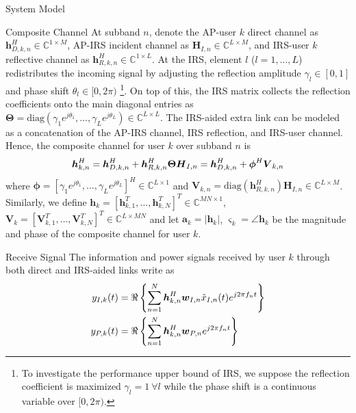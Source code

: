 \documentclass{IEEEtran}
\begin{document}
\begin{section}{System Model}
	\begin{subsection}{Composite Channel}
		At subband $n$, denote the AP-user $k$ direct channel as $\boldsymbol{h}_{D,k,n}^H \in \mathbb{C}^{1 \times M}$, AP-IRS incident channel as $\boldsymbol{H}_{I,n} \in \mathbb{C}^{L \times M}$, and IRS-user $k$ reflective channel as $\boldsymbol{h}_{R,k,n}^H \in \mathbb{C}^{1 \times L}$. At the IRS, element $l$ ($l=1,\dots,L$) redistributes the incoming signal by adjusting the reflection amplitude $\gamma_l \in [0,1]$ and phase shift $\theta_l \in [0,2\pi)$ \footnote{To investigate the performance upper bound of IRS, we suppose the reflection coefficient is maximized $\gamma_l=1 \ \forall l$ while the phase shift is a continuous variable over $[0,2\pi)$.}. On top of this, the IRS matrix collects the reflection coefficients onto the main diagonal entries as $\boldsymbol{\Theta} = \mathrm{diag}(\gamma_1 e^{j \theta_1}, \dots, \gamma_L e^{j \theta_L}) \in \mathbb{C}^{L \times L}$. The IRS-aided extra link can be modeled as a concatenation of the AP-IRS channel, IRS reflection, and IRS-user channel. Hence, the composite channel for user $k$ over subband $n$ is
		\begin{equation}\label{eq:h_{k,n}}
			\boldsymbol{h}_{k,n}^H = \boldsymbol{h}_{D,k,n}^H + \boldsymbol{h}_{R,k,n}^H \boldsymbol{\Theta} \boldsymbol{H}_{I,n} = \boldsymbol{h}_{D,k,n}^H + \boldsymbol{\phi}^H \boldsymbol{V}_{k,n}
		\end{equation}
		where $\boldsymbol{\phi}=[\gamma_1 e^{j \theta_1}, \dots, \gamma_L e^{j \theta_L}]^H \in \mathbb{C}^{L \times 1}$ and $\boldsymbol{V}_{k,n}=\mathrm{diag}(\boldsymbol{h}_{R,k,n}^H)\boldsymbol{H}_{I,n} \in \mathbb{C}^{L \times M}$. Similarly, we define $\boldsymbol{h}_k=[\boldsymbol{h}_{k,1}^T,\dots,\boldsymbol{h}_{k,N}^T]^T \in \mathbb{C}^{MN \times 1}$, $\boldsymbol{V}_k=[\boldsymbol{V}_{k,1}^T,\dots,\boldsymbol{V}_{k,N}^T]^T \in \mathbb{C}^{L \times MN}$ and let $\boldsymbol{a}_{k}=\lvert \boldsymbol{h}_{k} \rvert$, $\boldsymbol{\varsigma}_{k}=\angle{\boldsymbol{h}_{k}}$ be the magnitude and phase of the composite channel for user $k$.
	\end{subsection}

	\begin{subsection}{Receive Signal}
		The information and power signals received by user $k$ through both direct and IRS-aided links write as
		\begin{align}\label{eq:y_{I/P,k}}
			y_{I,k}(t) & = \Re\left\{\sum_{n=1}^N{\boldsymbol{h}_{k,n}^H}{\boldsymbol{w}_{I,n}\tilde{x}_{I,n}(t)}{e^{j2{\pi}{f_n}{t}}}\right\}\\
			y_{P,k}(t) & = \Re\left\{\sum_{n=1}^N{\boldsymbol{h}_{k,n}^H}\boldsymbol{w}_{P,n}{e^{j2{\pi}{f_n}{t}}}\right\}
		\end{align}
	\end{subsection}


\end{section}
\end{document}
